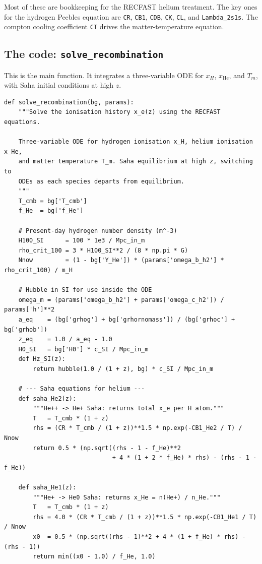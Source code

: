 \noindent Most of these are bookkeeping for the RECFAST helium treatment. The key ones for the hydrogen Peebles equation are \texttt{CR}, \texttt{CB1}, \texttt{CDB}, \texttt{CK}, \texttt{CL}, and \texttt{Lambda\_2s1s}. The compton cooling coefficient \texttt{CT} drives the matter-temperature equation.

\subsection{The code: \texttt{solve\_recombination}}

This is the main function. It integrates a three-variable ODE for $x_H$, $x_\mathrm{He}$, and $T_m$, with Saha initial conditions at high $z$.

\begin{codebox}
\begin{lstlisting}[style=python]
def solve_recombination(bg, params):
    """Solve the ionisation history x_e(z) using the RECFAST equations.

    Three-variable ODE for hydrogen ionisation x_H, helium ionisation x_He,
    and matter temperature T_m. Saha equilibrium at high z, switching to
    ODEs as each species departs from equilibrium.
    """
    T_cmb = bg['T_cmb']
    f_He  = bg['f_He']

    # Present-day hydrogen number density (m^-3)
    H100_SI      = 100 * 1e3 / Mpc_in_m
    rho_crit_100 = 3 * H100_SI**2 / (8 * np.pi * G)
    Nnow         = (1 - bg['Y_He']) * (params['omega_b_h2'] * rho_crit_100) / m_H

    # Hubble in SI for use inside the ODE
    omega_m = (params['omega_b_h2'] + params['omega_c_h2']) / params['h']**2
    a_eq    = (bg['grhog'] + bg['grhornomass']) / (bg['grhoc'] + bg['grhob'])
    z_eq    = 1.0 / a_eq - 1.0
    H0_SI   = bg['H0'] * c_SI / Mpc_in_m
    def Hz_SI(z):
        return hubble(1.0 / (1 + z), bg) * c_SI / Mpc_in_m

    # --- Saha equations for helium ---
    def saha_He2(z):
        """He++ -> He+ Saha: returns total x_e per H atom."""
        T   = T_cmb * (1 + z)
        rhs = (CR * T_cmb / (1 + z))**1.5 * np.exp(-CB1_He2 / T) / Nnow
        return 0.5 * (np.sqrt((rhs - 1 - f_He)**2
                              + 4 * (1 + 2 * f_He) * rhs) - (rhs - 1 - f_He))

    def saha_He1(z):
        """He+ -> He0 Saha: returns x_He = n(He+) / n_He."""
        T   = T_cmb * (1 + z)
        rhs = 4.0 * (CR * T_cmb / (1 + z))**1.5 * np.exp(-CB1_He1 / T) / Nnow
        x0  = 0.5 * (np.sqrt((rhs - 1)**2 + 4 * (1 + f_He) * rhs) - (rhs - 1))
        return min((x0 - 1.0) / f_He, 1.0)


\end{lstlisting}
\end{codebox}
